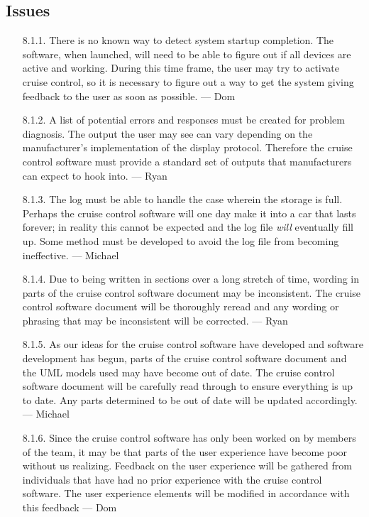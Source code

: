 \documentclass{article}
\begin{document}
	\subsection{Issues}
	\begin{enumerate}
		\item[8.1.1.] There is no known way to detect system startup completion. The software, when launched, will need to be able to figure out if all devices are active and working. During this time frame, the user may try to activate cruise control, so it is necessary to figure out a way to get the system giving feedback to the user as soon as possible. --- Dom
		
		\item[8.1.2.] A list of potential errors and responses must be created for problem diagnosis. The output the user may see can vary depending on the manufacturer's implementation of the display protocol. Therefore the cruise control software must provide a standard set of outputs that manufacturers can expect to hook into. --- Ryan
		
		\item[8.1.3.] The log must be able to handle the case wherein the storage is full. Perhaps the cruise control software will one day make it into a car that lasts forever; in reality this cannot be expected and the log file \textit{will} eventually fill up. Some method must be developed to avoid the log file from becoming ineffective. --- Michael
		
		\item[8.1.4.] Due to being written in sections over a long stretch of time, wording in parts of the cruise control software document may be inconsistent. The cruise control software document will be thoroughly reread and any wording or phrasing that may be inconsistent will be corrected. --- Ryan
		
		\item[8.1.5.] As our ideas for the cruise control software have developed and software development has begun, parts of the cruise control software document and the UML models used may have become out of date. The cruise control software document will be carefully read through to ensure everything is up to date. Any parts determined to be out of date will be updated accordingly. --- Michael
		
		\item[8.1.6.] Since the cruise control software has only been worked on by members of the team, it may be that parts of the user experience have become poor without us realizing. Feedback on the user experience will be gathered from individuals that have had no prior experience with the cruise control software. The user experience elements will be modified in accordance with this feedback --- Dom


\end{enumerate}
\end{document}
